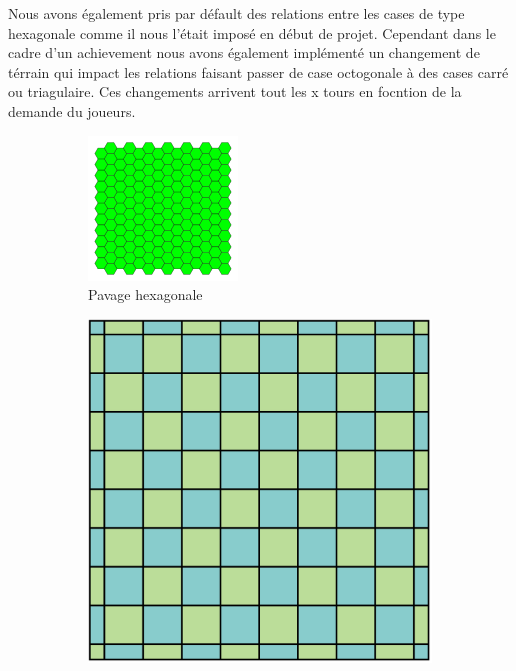 \documentclass{article}
\begin{document}
\begin{itemize}
\begin{itemize}
        
        Nous avons également pris par défault des relations entre les cases de type hexagonale comme il nous l'était imposé en début de projet. Cependant dans le cadre d'un achievement nous avons également implémenté un changement de térrain qui impact les relations faisant passer de case octogonale à des cases carré ou triagulaire. Ces changements arrivent tout les x tours en focntion de la demande du joueurs.
\begin{figure}[htbp]
\centering
\begin{subfigure}{0.3\textwidth}
\centering
\includegraphics[width=\textwidth]{1-uniform_n1.svg.png}
\caption{Pavage hexagonale}
\label{label_de_l_image_1}
\end{subfigure}
\quad
\begin{subfigure}{0.3\textwidth}
\centering
\includegraphics[width=\textwidth]{1200px-Tiling_Regular_4-4_Square.svg.png}

\end{subfigure}
\end{figure}
\end{itemize}
\end{itemize}
\end{document}
